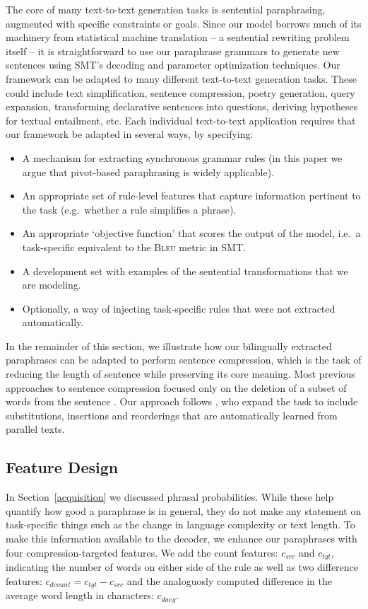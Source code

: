 \documentclass[11pt]{article}
\begin{document}
The core of many text-to-text generation tasks is sentential
paraphrasing, augmented with specific constraints or goals. Since our
model borrows much of its machinery from statistical machine
translation -- a sentential rewriting problem itself -- it is
straightforward to use our paraphrase grammars to generate new
sentences using SMT's decoding and parameter optimization
techniques. Our framework can be adapted to many different
text-to-text generation tasks.  These could include text
simplification, sentence compression, poetry generation, query
expansion, transforming declarative sentences into questions, deriving
hypotheses for textual entailment, etc.  Each individual text-to-text
application requires that our framework be adapted in several ways, by
specifying:
\begin{itemize}
\item A mechanism for extracting synchronous grammar rules (in this
  paper we argue that pivot-based paraphrasing is widely applicable).
\item An appropriate set of rule-level features that capture
  information pertinent to the task (e.g.\ whether a rule simplifies a
  phrase).
\item An appropriate `objective function' that scores the output of
  the model, i.e.\ a task-specific equivalent to the \textsc{Bleu}
  metric in SMT.
\item A development set with examples of the sentential
  transformations that we are modeling.
\item Optionally, a way of injecting task-specific rules that were not
  extracted automatically.
\end{itemize} 
In the remainder of this section, we illustrate how our bilingually
extracted paraphrases can be adapted to perform sentence compression,
which is the task of reducing the length of sentence while preserving
its core meaning.  Most previous approaches to sentence compression
focused only on the deletion of a subset of words from the sentence
\cite{KnightMarcuAI02}.  Our approach follows
, who expand the task to include
substitutions, insertions and reorderings that are automatically
learned from parallel texts.

\subsection{Feature Design}
In Section~\ref{acquisition} we discussed phrasal
probabilities. While these help quantify how good a paraphrase is in
general, they do not make any statement on task-specific things such
as the change in language complexity or text length. To make this
information available to the decoder, we enhance our paraphrases with
four compression-targeted features. We add the count features:
$c_{\mathit{src}}$ and $c_{\mathit{tgt}}$, indicating the number of
words on either side of the rule as well as two difference features:
$c_{\mathit{dcount}} = c_{\mathit{tgt}} - c_{\mathit{src}}$ and the
analoguosly computed difference in the average word length in
characters: $c_{\mathit{davg}}$.
\end{document}
